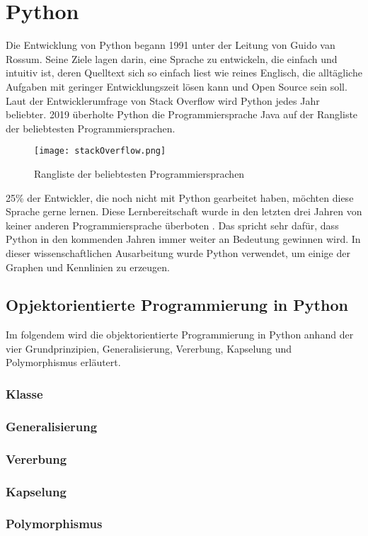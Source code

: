 
\chapter{Python}

Die Entwicklung von Python begann 1991 unter der Leitung von Guido van Rossum. Seine Ziele lagen darin, eine Sprache zu entwickeln, die einfach und intuitiv ist, deren Quelltext sich so einfach liest wie reines Englisch, die alltägliche Aufgaben mit geringer Entwicklungszeit lösen kann und Open Source sein soll.
Laut der Entwicklerumfrage von Stack Overflow wird Python jedes Jahr beliebter. 2019 überholte Python die Programmiersprache Java auf der Rangliste der beliebtesten Programmiersprachen. 

\begin{figure}[!htb]
\texttt{[image: stackOverflow.png]}%
\caption{Rangliste der beliebtesten Programmiersprachen }
\label{img:stackoverflowBild}
\end{figure}

25\% der Entwickler, die noch nicht mit Python gearbeitet haben, möchten diese Sprache gerne lernen. Diese Lernbereitschaft wurde in den letzten drei Jahren von keiner anderen Programmiersprache überboten \cite{stackoverflow}. Das spricht sehr dafür, dass Python in den kommenden Jahren immer weiter an Bedeutung gewinnen wird. In dieser wissenschaftlichen Ausarbeitung wurde Python verwendet, um einige der Graphen und Kennlinien zu erzeugen. 

\section{Opjektorientierte Programmierung in Python}

Im folgendem wird die objektorientierte Programmierung in Python anhand der vier Grundprinzipien, Generalisierung, Vererbung, Kapselung und Polymorphismus erläutert. 

\subsection{Klasse}

\subsection{Generalisierung}

\subsection{Vererbung}
\subsection{Kapselung}
\subsection{Polymorphismus}
